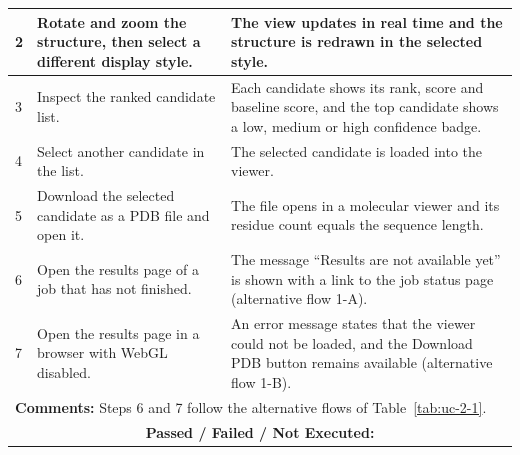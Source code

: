 \documentclass{FastFyp}
\begin{document}
{\begin{longtable}{|p{2.4cm}|p{4.6cm}|p{2.4cm}|p{3.8cm}|}
2 & Rotate and zoom the structure, then select a different display style. & \multicolumn{2}{p{6.64cm}|}{The view updates in real time and the structure is redrawn in the selected style.} \\ \hline
3 & Inspect the ranked candidate list. & \multicolumn{2}{p{6.64cm}|}{Each candidate shows its rank, score and baseline score, and the top candidate shows a low, medium or high confidence badge.} \\ \hline
4 & Select another candidate in the list. & \multicolumn{2}{p{6.64cm}|}{The selected candidate is loaded into the viewer.} \\ \hline
5 & Download the selected candidate as a PDB file and open it. & \multicolumn{2}{p{6.64cm}|}{The file opens in a molecular viewer and its residue count equals the sequence length.} \\ \hline
6 & Open the results page of a job that has not finished. & \multicolumn{2}{p{6.64cm}|}{The message ``Results are not available yet'' is shown with a link to the job status page (alternative flow 1-A).} \\ \hline
7 & Open the results page in a browser with WebGL disabled. & \multicolumn{2}{p{6.64cm}|}{An error message states that the viewer could not be loaded, and the Download PDB button remains available (alternative flow 1-B).} \\ \hline
\multicolumn{4}{|p{14.51cm}|}{\textbf{Comments:} Steps 6 and 7 follow the alternative flows of Table~\ref{tab:uc-2-1}.} \\ \hline
\multicolumn{4}{|c|}{\textbf{Passed / Failed / Not Executed:}} \\ \hline
\end{longtable}
}
\end{document}

